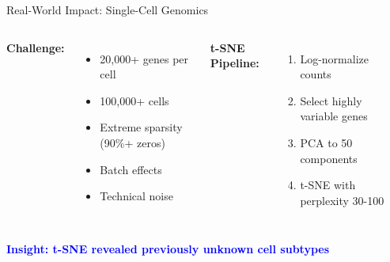 \documentclass[aspectratio=169]{beamer}
\newcommand{\conceptbox}[2]{\colorbox{#1!20}{\textcolor{#1}{\textbf{#2}}}}
\newcommand{\insight}[1]{\conceptbox{blue}{Insight: #1}}
\begin{document}
\begin{frame}{Real-World Impact: Single-Cell Genomics}
\begin{columns}
\textbf{Challenge:}
\begin{itemize}
\item 20,000+ genes per cell
\item 100,000+ cells
\item Extreme sparsity (90\%+ zeros)
\item Batch effects
\item Technical noise
\end{itemize}

\textbf{t-SNE Pipeline:}
\begin{enumerate}
\item Log-normalize counts
\item Select highly variable genes
\item PCA to 50 components
\item t-SNE with perplexity 30-100
\end{enumerate}

\begin{center}
\end{center}
\end{columns}

\insight{t-SNE revealed previously unknown cell subtypes}
\end{frame}
\end{document}
